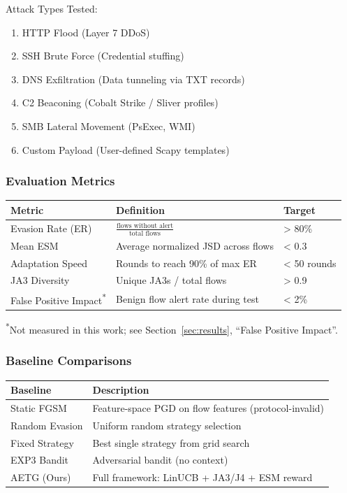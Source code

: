 \documentclass[review]{elsarticle}
\begin{document}
Attack Types Tested:
\begin{enumerate}
\item HTTP Flood (Layer 7 DDoS)
\item SSH Brute Force (Credential stuffing)
\item DNS Exfiltration (Data tunneling via TXT records)
\item C2 Beaconing (Cobalt Strike / Sliver profiles)
\item SMB Lateral Movement (PsExec, WMI)
\item Custom Payload (User-defined Scapy templates)
\end{enumerate}

\subsubsection{Evaluation Metrics}
\begin{table}[htbp]
\small
\centering
\renewcommand{\arraystretch}{1.2}
\begin{tabular}{|l|l|l|}
\hline
\textbf{Metric} & \textbf{Definition} & \textbf{Target} \\
\hline
Evasion Rate (ER) & $\frac{\text{flows without alert}}{\text{total flows}}$ & > 80\% \\
Mean ESM & Average normalized JSD across flows & < 0.3 \\
Adaptation Speed & Rounds to reach 90\% of max ER & < 50 rounds \\
JA3 Diversity & Unique JA3s / total flows & > 0.9 \\
False Positive Impact\textsuperscript{*} & Benign flow alert rate during test & < 2\% \\
\hline
\end{tabular}
\end{table}
\noindent\small\textsuperscript{*}Not measured in this work; see Section~\ref{sec:results}, ``False Positive Impact''.

\subsubsection{Baseline Comparisons}
\begin{table}[htbp]
\small
\centering
\renewcommand{\arraystretch}{1.2}
\begin{tabular}{|l|l|}
\hline
\textbf{Baseline} & \textbf{Description} \\
\hline
Static FGSM & Feature-space PGD on flow features (protocol-invalid) \\
Random Evasion & Uniform random strategy selection \\
Fixed Strategy & Best single strategy from grid search \\
EXP3 Bandit & Adversarial bandit (no context) \\
AETG (Ours) & Full framework: LinUCB + JA3/J4 + ESM reward \\
\hline
\end{tabular}
\end{table}
\end{document}
